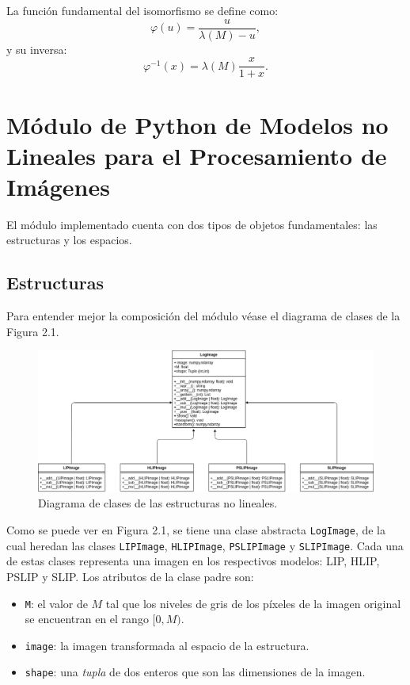 La funci\'on fundamental del isomorfismo se define como:
\begin{equation}
	\varphi(u)=\frac{u}{\lambda(M)-u},
\end{equation}
y su inversa:
\begin{equation}
	\varphi^{-1}(x)=\lambda(M)\frac{x}{1+x}.
\end{equation}

\section{M\'odulo de Python de Modelos no Lineales para el Procesamiento de Im\'agenes}

El m\'odulo implementado cuenta con dos tipos de objetos fundamentales: las estructuras y los espacios.

\subsection{Estructuras}

Para entender mejor la composici\'on del m\'odulo v\'ease el diagrama de clases de la Figura 2.1.

\begin{figure}[h]
	\begin{center}
		\includegraphics[width=16.0 cm]{images/structures_class_diagram.png}
		\caption{Diagrama de clases de las estructuras no lineales.}
	\end{center}
\end{figure}

Como se puede ver en Figura 2.1, se tiene una clase abstracta \verb|LogImage|, de la cual heredan las clases \verb|LIPImage|, \verb|HLIPImage|, \verb|PSLIPImage| y \verb|SLIPImage|. Cada una de estas clases representa una imagen en los respectivos modelos: LIP, HLIP, PSLIP y SLIP. Los atributos de la clase padre son:

\begin{itemize}
	\item \verb|M|: el valor de $M$ tal que los niveles de gris de los p\'ixeles de la imagen original se encuentran en el rango $[0,M)$.
	\item \verb|image|: la imagen transformada al espacio de la estructura.
	\item \verb|shape|: una \textit{tupla} de dos enteros que son las dimensiones de la imagen.
\end{itemize}

